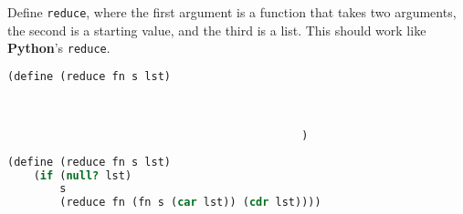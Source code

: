 \question Define {\tt reduce}, where the first argument is a function that takes
two arguments, the second is a starting value, and the third is a list. This should
work like \textbf{Python}'s {\tt reduce}.

\begin{lstlisting}[language=Scheme]
(define (reduce fn s lst)



                                             )
\end{lstlisting}
\begin{solution}
\begin{lstlisting}[language=Scheme]
(define (reduce fn s lst)
    (if (null? lst)
        s
        (reduce fn (fn s (car lst)) (cdr lst))))
\end{lstlisting}
\end{solution}
